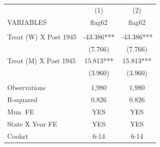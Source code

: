\begin{tabular}{lcc} \hline
 & (1) & (2) \\
VARIABLES & flag62 & flag62 \\ \hline
 &  &  \\
Treat (W) X Post 1945 & -43.386*** & -43.386*** \\
 & (7.766) & (7.766) \\
Treat (M) X Post 1945 & 15.813*** & 15.813*** \\
 & (3.960) & (3.960) \\
 &  &  \\
Observations & 1,980 & 1,980 \\
R-squared & 0.826 & 0.826 \\
Mun. FE & YES & YES \\
State X Year FE & YES & YES \\
 Coohrt & 6-14 & 6-14 \\ \hline
\end{tabular}
